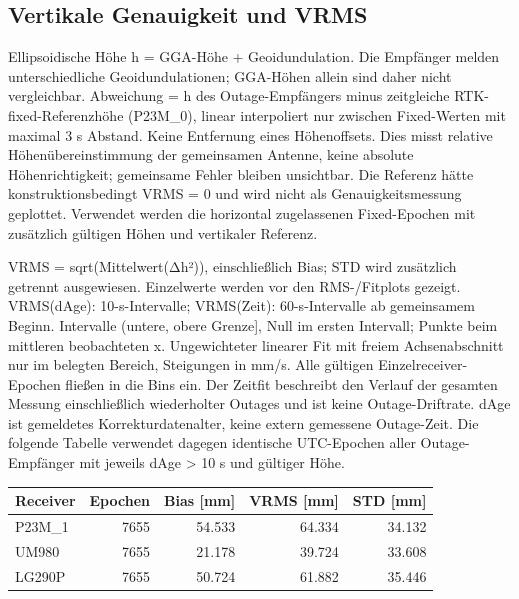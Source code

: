 \documentclass[11pt,a4paper]{article}
\numberwithin{equation}{section}
\numberwithin{figure}{section}
\begin{document}
\subsection{Vertikale Genauigkeit und VRMS}

Ellipsoidische Höhe h = GGA-Höhe + Geoidundulation. Die Empfänger melden unterschiedliche Geoidundulationen; GGA-Höhen allein sind daher nicht vergleichbar. Abweichung = h des Outage-Empfängers minus zeitgleiche RTK-fixed-Referenzhöhe (P23M\_0), linear interpoliert nur zwischen Fixed-Werten mit maximal 3 s Abstand. Keine Entfernung eines Höhenoffsets. Dies misst relative Höhenübereinstimmung der gemeinsamen Antenne, keine absolute Höhenrichtigkeit; gemeinsame Fehler bleiben unsichtbar. Die Referenz hätte konstruktionsbedingt VRMS = 0 und wird nicht als Genauigkeitsmessung geplottet. Verwendet werden die horizontal zugelassenen Fixed-Epochen mit zusätzlich gültigen Höhen und vertikaler Referenz.

VRMS = sqrt(Mittelwert(Δh²)), einschließlich Bias; STD wird zusätzlich getrennt ausgewiesen. Einzelwerte werden vor den RMS-/\allowbreak{}Fitplots gezeigt. VRMS(dAge): 10-s-Intervalle; VRMS(Zeit): 60-s-Intervalle ab gemeinsamem Beginn. Intervalle (untere, obere Grenze], Null im ersten Intervall; Punkte beim mittleren beobachteten x. Ungewichteter linearer Fit mit freiem Achsenabschnitt nur im belegten Bereich, Steigungen in mm/\allowbreak{}s. Alle gültigen Einzelreceiver-Epochen fließen in die Bins ein. Der Zeitfit beschreibt den Verlauf der gesamten Messung einschließlich wiederholter Outages und ist keine Outage-Driftrate. dAge ist gemeldetes Korrekturdatenalter, keine extern gemessene Outage-Zeit. Die folgende Tabelle verwendet dagegen identische UTC-Epochen aller Outage-Empfänger mit jeweils dAge > 10 s und gültiger Höhe.

\begin{center}\begin{lrbox}{\reporttable}\small\setlength{\tabcolsep}{4pt}\begin{tabular}{lrrrr}\toprule
Receiver & Epochen & Bias [mm] & VRMS [mm] & STD [mm]\\\midrule
P23M\_1 & 7655 & 54.533 & 64.334 & 34.132\\
UM980 & 7655 & 21.178 & 39.724 & 33.608\\
LG290P & 7655 & 50.724 & 61.882 & 35.446\\
\bottomrule\end{tabular}\end{lrbox}\ifdim\wd\reporttable>\linewidth\resizebox{\linewidth}{!}{\usebox{\reporttable}}\else\usebox{\reporttable}\fi\end{center}
\end{document}
